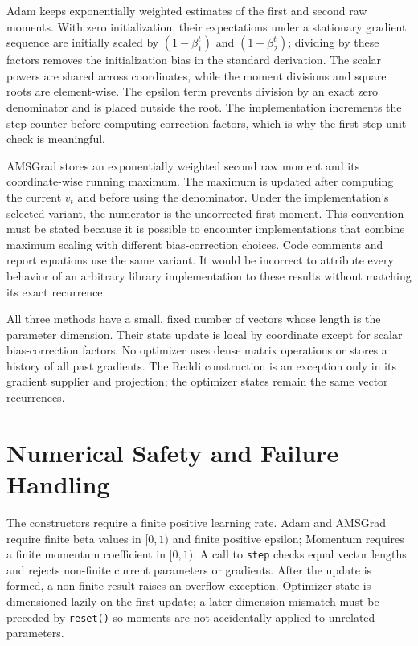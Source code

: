 \documentclass[conference]{IEEEtran}
\begin{document}
Adam keeps exponentially weighted estimates of the first and second raw moments. With zero initialization, their expectations under a stationary gradient sequence are initially scaled by $(1-\beta_1^t)$ and $(1-\beta_2^t)$; dividing by these factors removes the initialization bias in the standard derivation. The scalar powers are shared across coordinates, while the moment divisions and square roots are element-wise. The epsilon term prevents division by an exact zero denominator and is placed outside the root. The implementation increments the step counter before computing correction factors, which is why the first-step unit check is meaningful.

AMSGrad stores an exponentially weighted second raw moment and its coordinate-wise running maximum. The maximum is updated after computing the current $v_t$ and before using the denominator. Under the implementation's selected variant, the numerator is the uncorrected first moment. This convention must be stated because it is possible to encounter implementations that combine maximum scaling with different bias-correction choices. Code comments and report equations use the same variant. It would be incorrect to attribute every behavior of an arbitrary library implementation to these results without matching its exact recurrence.

All three methods have a small, fixed number of vectors whose length is the parameter dimension. Their state update is local by coordinate except for scalar bias-correction factors. No optimizer uses dense matrix operations or stores a history of all past gradients. The Reddi construction is an exception only in its gradient supplier and projection; the optimizer states remain the same vector recurrences.
\section{Numerical Safety and Failure Handling}
The constructors require a finite positive learning rate. Adam and AMSGrad require finite beta values in $[0,1)$ and finite positive epsilon; Momentum requires a finite momentum coefficient in $[0,1)$. A call to \texttt{step} checks equal vector lengths and rejects non-finite current parameters or gradients. After the update is formed, a non-finite result raises an overflow exception. Optimizer state is dimensioned lazily on the first update; a later dimension mismatch must be preceded by \texttt{reset()} so moments are not accidentally applied to unrelated parameters.
\end{document}
